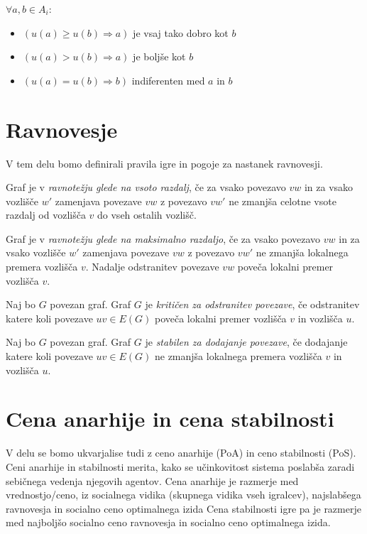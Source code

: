 \documentclass[fin1, tisk]{fmfdelo}
\begin{document}
$\forall a,b \in A_i:$
\begin{itemize}
    \item $(u(a) \geq u(b) \Rightarrow a)$ je vsaj tako dobro kot $b$
    \item $(u(a) > u(b) \Rightarrow a)$ je boljše kot $b$
    \item $(u(a) = u(b) \Rightarrow b)$ indiferenten med $a$ in $b$
\end{itemize}


\section{Ravnovesje}
V tem delu bomo definirali pravila igre in pogoje za nastanek ravnovesji.

\begin{definicija}
Graf je v \textit{ravnotežju glede na vsoto razdalj}, če za vsako povezavo $vw$ in
za vsako vozlišče $w'$ zamenjava povezave $vw$ z povezavo $vw'$ ne zmanjša
celotne vsote razdalj od vozlišča $v$ do vseh ostalih vozlišč.
\end{definicija}

\begin{definicija}
Graf je v \textit{ravnotežju glede na maksimalno razdaljo}, če za vsako povezavo $vw$
in za vsako vozlišče $w'$ zamenjava povezave $vw$ z povezavo $vw'$ ne zmanjša
lokalnega premera vozlišča $v$. Nadalje odstranitev povezave $vw$ poveča
lokalni premer vozlišča $v$.
\end{definicija}


\begin{definicija}
Naj bo $G$ povezan graf. Graf $G$ je \textit{kritičen za odstranitev povezave},
če odstranitev katere koli povezave $uv \in E(G)$ poveča lokalni premer vozlišča $v$ in vozlišča $u$.
\end{definicija}

\begin{definicija}
Naj bo $G$ povezan graf. Graf $G$ je \textit{stabilen za dodajanje povezave},
če dodajanje katere koli povezave $uv \in E(G)$ ne zmanjša lokalnega premera vozlišča $v$ in vozlišča $u$.
\end{definicija}

\section{Cena anarhije in cena stabilnosti}
V delu se bomo ukvarjalise tudi z ceno anarhije (PoA) in ceno stabilnosti (PoS).
Ceni anarhije in stabilnosti merita, kako se učinkovitost sistema poslabša zaradi sebičnega vedenja njegovih agentov.
Cena anarhije je razmerje med vrednostjo/ceno, iz socialnega vidika (skupnega vidika vseh igralcev), najslabšega ravnovesja in socialno ceno optimalnega izida
Cena stabilnosti igre pa je razmerje med najboljšo socialno ceno ravnovesja in socialno ceno optimalnega izida.\\
\end{document}
